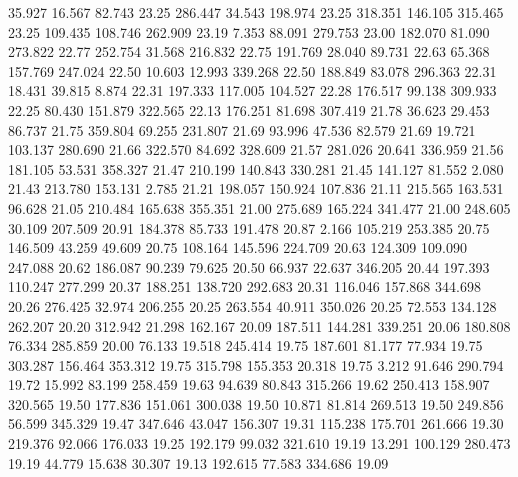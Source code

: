  35.927   16.567   82.743        23.25
 286.447   34.543  198.974        23.25
 318.351  146.105  315.465        23.25
 109.435  108.746  262.909        23.19
   7.353   88.091  279.753        23.00
 182.070   81.090  273.822        22.77
 252.754   31.568  216.832        22.75
 191.769   28.040   89.731        22.63
  65.368  157.769  247.024        22.50
  10.603   12.993  339.268        22.50
 188.849   83.078  296.363        22.31
  18.431   39.815    8.874        22.31
 197.333  117.005  104.527        22.28
 176.517   99.138  309.933        22.25
  80.430  151.879  322.565        22.13
 176.251   81.698  307.419        21.78
  36.623   29.453   86.737        21.75
 359.804   69.255  231.807        21.69
  93.996   47.536   82.579        21.69
  19.721  103.137  280.690        21.66
 322.570   84.692  328.609        21.57
 281.026   20.641  336.959        21.56
 181.105   53.531  358.327        21.47
 210.199  140.843  330.281        21.45
 141.127   81.552    2.080        21.43
 213.780  153.131    2.785        21.21
 198.057  150.924  107.836        21.11
 215.565  163.531   96.628        21.05
 210.484  165.638  355.351        21.00
 275.689  165.224  341.477        21.00
 248.605   30.109  207.509        20.91
 184.378   85.733  191.478        20.87
   2.166  105.219  253.385        20.75
 146.509   43.259   49.609        20.75
 108.164  145.596  224.709        20.63
 124.309  109.090  247.088        20.62
 186.087   90.239   79.625        20.50
  66.937   22.637  346.205        20.44
 197.393  110.247  277.299        20.37
 188.251  138.720  292.683        20.31
 116.046  157.868  344.698        20.26
 276.425   32.974  206.255        20.25
 263.554   40.911  350.026        20.25
  72.553  134.128  262.207        20.20
 312.942   21.298  162.167        20.09
 187.511  144.281  339.251        20.06
 180.808   76.334  285.859        20.00
  76.133   19.518  245.414        19.75
 187.601   81.177   77.934        19.75
 303.287  156.464  353.312        19.75
 315.798  155.353   20.318        19.75
   3.212   91.646  290.794        19.72
  15.992   83.199  258.459        19.63
  94.639   80.843  315.266        19.62
 250.413  158.907  320.565        19.50
 177.836  151.061  300.038        19.50
  10.871   81.814  269.513        19.50
 249.856   56.599  345.329        19.47
 347.646   43.047  156.307        19.31
 115.238  175.701  261.666        19.30
 219.376   92.066  176.033        19.25
 192.179   99.032  321.610        19.19
  13.291  100.129  280.473        19.19
  44.779   15.638   30.307        19.13
 192.615   77.583  334.686        19.09

